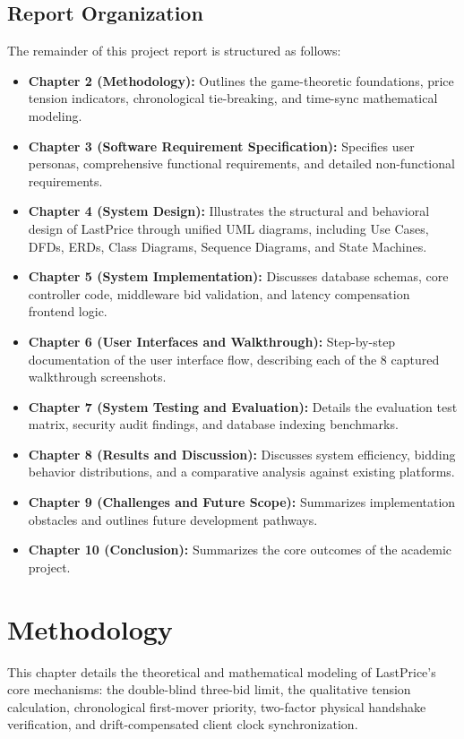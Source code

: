 \documentclass[12pt,a4paper,oneside]{report}
\begin{document}
\section{Report Organization}
The remainder of this project report is structured as follows:
\begin{itemize}
    \item \textbf{Chapter 2 (Methodology):} Outlines the game-theoretic foundations, price tension indicators, chronological tie-breaking, and time-sync mathematical modeling.
    \item \textbf{Chapter 3 (Software Requirement Specification):} Specifies user personas, comprehensive functional requirements, and detailed non-functional requirements.
    \item \textbf{Chapter 4 (System Design):} Illustrates the structural and behavioral design of LastPrice through unified UML diagrams, including Use Cases, DFDs, ERDs, Class Diagrams, Sequence Diagrams, and State Machines.
    \item \textbf{Chapter 5 (System Implementation):} Discusses database schemas, core controller code, middleware bid validation, and latency compensation frontend logic.
    \item \textbf{Chapter 6 (User Interfaces and Walkthrough):} Step-by-step documentation of the user interface flow, describing each of the 8 captured walkthrough screenshots.
    \item \textbf{Chapter 7 (System Testing and Evaluation):} Details the evaluation test matrix, security audit findings, and database indexing benchmarks.
    \item \textbf{Chapter 8 (Results and Discussion):} Discusses system efficiency, bidding behavior distributions, and a comparative analysis against existing platforms.
    \item \textbf{Chapter 9 (Challenges and Future Scope):} Summarizes implementation obstacles and outlines future development pathways.
    \item \textbf{Chapter 10 (Conclusion):} Summarizes the core outcomes of the academic project.
\end{itemize}

\chapter{Methodology}

This chapter details the theoretical and mathematical modeling of LastPrice's core mechanisms: the double-blind three-bid limit, the qualitative tension calculation, chronological first-mover priority, two-factor physical handshake verification, and drift-compensated client clock synchronization.
\end{document}
